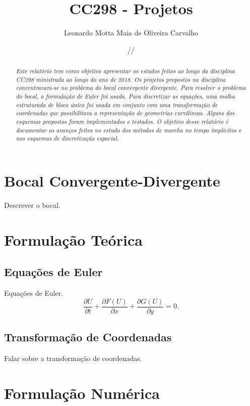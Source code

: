 \documentclass[a4paper, twoside, 12pt]{article}
\title{\textbf{CC298 - Projetos}}
\author{Leonardo Motta Maia de Oliveira Carvalho}
\date{\oldstylenums{00}/\oldstylenums{00}/\oldstylenums{00}}
\numberwithin{equation}{section}
\begin{document}

\maketitle
\tableofcontents
 
\begin{abstract}
    \textit{Este relatório tem  como objetivo apresentar os estudos feitos ao
    longo da disciplina CC298 ministrada ao longo do ano de 2018. Os projetos
    propostos na disciplina concentravam-se no problema do bocal convergente
    divergente. Para resolver o problema do bocal, a formulação de Euler foi
    usada. Para discretizar as equações, uma malha estruturada de bloco único
    foi usada em conjunto com uma transformação de coordenadas que
    possibilitava a representação de geometrias curvilíneas. Alguns dos
    esquemas propostos foram implementados e testados. O objetivo desse
    relatório é documentar os avanços feitos no estudo dos métodos de marcha no
    tempo implicitos e nos esquemas de discretização espacial.}
\end{abstract}

\section{Bocal Convergente-Divergente}

Descrever o bocal.

\section{Formulação Teórica}

\subsection{Equações de Euler}
Equações de Euler.
\begin{equation}
\frac{\partial U}{\partial t}+\frac{\partial F(U)}{\partial x}+\frac{\partial G(U)}{\partial y}=0.
\end{equation}

\subsection{Transformação de Coordenadas}
Falar sobre a transformação de coordenadas.

\section{Formulação Numérica}
\end{document}
